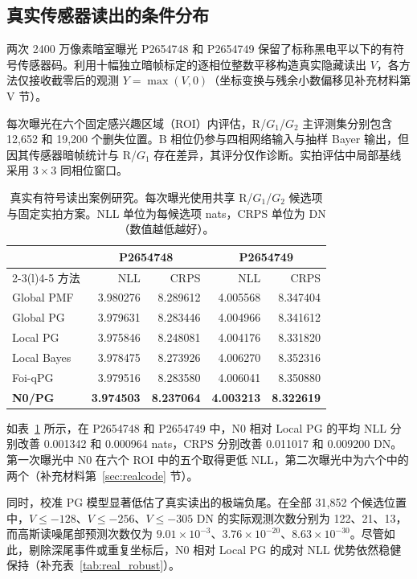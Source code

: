 \documentclass[10pt,twocolumn,journal]{IEEEtran}
\begin{document}
\subsection{真实传感器读出的条件分布}
两次 2400 万像素暗室曝光 P2654748 和 P2654749 保留了标称黑电平以下的有符号传感器码。利用十幅独立暗帧标定的逐相位整数平移构造真实隐藏读出 $V$，各方法仅接收截零后的观测 $Y=\max(V,0)$（坐标变换与残余小数偏移见补充材料第 V 节）。

每次曝光在六个固定感兴趣区域（ROI）内评估，R/$G_1$/$G_2$ 主评测集分别包含 12,652 和 19,200 个删失位置。B 相位仍参与四相网络输入与抽样 Bayer 输出，但因其传感器暗帧统计与 R/$G_1$ 存在差异，其评分仅作诊断。实拍评估中局部基线采用 $3\times3$ 同相位窗口。

\begin{table}[t]
\centering\footnotesize
\setlength{\tabcolsep}{3pt}
\caption{真实有符号读出案例研究。每次曝光使用共享 R/$G_1$/$G_2$ 候选项与固定实拍方案。NLL 单位为每候选项 nats，CRPS 单位为 DN（数值越低越好）。}
\label{tab:real}
\begin{tabular}{@{}lrrrr@{}}
\toprule
& \multicolumn{2}{c}{P2654748} & \multicolumn{2}{c}{P2654749}\\
\cmidrule(lr){2-3}\cmidrule(l){4-5}
方法 & NLL & CRPS & NLL & CRPS\\
\midrule
Global PMF & 3.980276 & 8.289612 & 4.005568 & 8.347404\\
Global PG & 3.979631 & 8.283446 & 4.004966 & 8.341612\\
Local PG & 3.975846 & 8.248081 & 4.004176 & 8.331820\\
Local Bayes & 3.978475 & 8.273926 & 4.006270 & 8.352316\\
Foi-qPG & 3.979516 & 8.283580 & 4.006041 & 8.350880\\
\textbf{N0/PG} & \textbf{3.974503} & \textbf{8.237064} & \textbf{4.003213} & \textbf{8.322619}\\
\bottomrule
\end{tabular}
\end{table}

如表~\ref{tab:real} 所示，在 P2654748 和 P2654749 中，N0 相对 Local PG 的平均 NLL 分别改善 0.001342 和 0.000964 nats，CRPS 分别改善 0.011017 和 0.009200 DN。第一次曝光中 N0 在六个 ROI 中的五个取得更低 NLL，第二次曝光中为六个中的两个（补充材料第~\ref{sec:realcode} 节）。

同时，校准 PG 模型显著低估了真实读出的极端负尾。在全部 31,852 个候选位置中，$V\leq-128$、$V\leq-256$、$V\leq-305$ DN 的实际观测次数分别为 122、21、13，而高斯读噪尾部预测次数仅为 $9.01\times10^{-3}$、$3.76\times10^{-20}$、$8.63\times10^{-30}$。尽管如此，剔除深尾事件或重复坐标后，N0 相对 Local PG 的成对 NLL 优势依然稳健保持（补充表~\ref{tab:real_robust}）。
\end{document}
